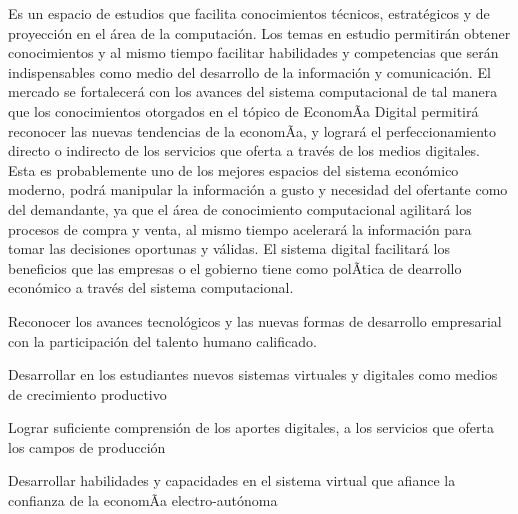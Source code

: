 \begin{syllabus}


\begin{justification}
Es un espacio de estudios que facilita conocimientos técnicos, estratégicos y de proyección en el área de la computación. Los temas en estudio permitirán obtener conocimientos y al mismo tiempo facilitar habilidades y competencias que serán indispensables como medio del desarrollo de la información y comunicación. El mercado se fortalecerá con los avances del sistema computacional de tal manera que los conocimientos otorgados en el tópico de EconomÃ­a Digital permitirá reconocer las nuevas tendencias de la economÃ­a, y logrará el perfeccionamiento directo o indirecto de los servicios que oferta a través de los medios digitales. Esta es probablemente uno de los mejores espacios del sistema económico moderno, podrá manipular la información a gusto y necesidad del ofertante como del demandante, ya que el área de conocimiento computacional agilitará los procesos de compra y venta, al mismo tiempo acelerará la información para tomar las decisiones oportunas y válidas. El sistema digital facilitará los beneficios que las empresas o el gobierno tiene como polÃ­tica de dearrollo económico a través del sistema computacional.
\end{justification}

\begin{goals}
\item Reconocer los avances tecnológicos y las nuevas formas de desarrollo empresarial con la participación del talento humano calificado.
\item Desarrollar en los estudiantes nuevos sistemas virtuales y digitales como medios de crecimiento productivo
\item Lograr suficiente comprensión de los aportes digitales, a los servicios que oferta los campos de producción
\item Desarrollar habilidades y capacidades en el sistema virtual que afiance la confianza de la economÃ­a electro-autónoma
\end{goals}

\begin{outcomes}
\end{outcomes}


\end{syllabus}
